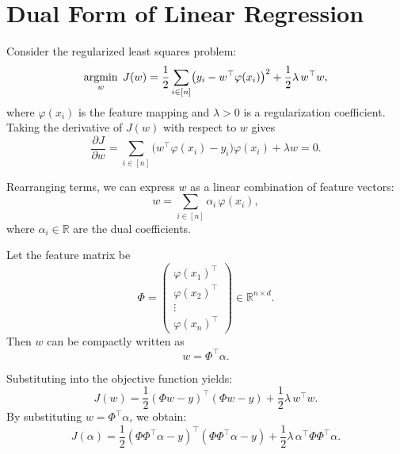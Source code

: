 \documentclass[../main]{subfiles}
\begin{document}
\section{Dual Form of Linear Regression}
Consider the regularized least squares problem:
\begin{equation}
    \mathop{\mathrm{argmin}}_{w} \; J(w)
    = \frac{1}{2} \sum_{i \in [n]} \bigl(y_i - w^\top \varphi(x_i)\bigr)^2
    + \frac{1}{2}\lambda\, w^\top w,
\end{equation}
where $\varphi(x_i)$ is the feature mapping and $\lambda > 0$ is a regularization coefficient.
Taking the derivative of $J(w)$ with respect to $w$ gives
\begin{equation}
    \frac{\partial J}{\partial w}
    = \sum_{i \in [n]} \bigl(w^\top \varphi(x_i) - y_i\bigr)\varphi(x_i)
    + \lambda w = 0.
\end{equation}

Rearranging terms, we can express $w$ as a linear combination of feature vectors:
\begin{equation}
    w = \sum_{i \in [n]} \alpha_i\, \varphi(x_i),
\end{equation}
where $\alpha_i \in \mathbb{R}$ are the dual coefficients.

Let the feature matrix be
\begin{equation}
    \Phi =
    \begin{pmatrix}
        \varphi(x_1)^\top \\
        \varphi(x_2)^\top \\
        \vdots \\
        \varphi(x_n)^\top
    \end{pmatrix}
    \in \mathbb{R}^{n \times d}.
\end{equation}
Then $w$ can be compactly written as
\begin{equation}
    w = \Phi^\top \alpha.
\end{equation}

Substituting into the objective function yields:
\begin{equation}
    J(w)
    = \frac{1}{2} (\Phi w - y)^\top (\Phi w - y)
    + \frac{1}{2}\lambda\, w^\top w.
\end{equation}
By substituting $w = \Phi^\top \alpha$, we obtain:
\begin{equation}
    J(\alpha)
    = \frac{1}{2} (\Phi \Phi^\top \alpha - y)^\top (\Phi \Phi^\top \alpha - y)
    + \frac{1}{2}\lambda\, \alpha^\top \Phi \Phi^\top \alpha.
\end{equation}
\end{document}
